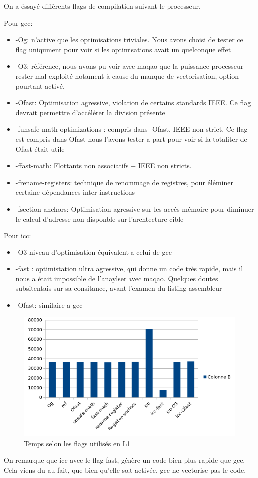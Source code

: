 \documentclass{report}
\begin{document}
On a éssayé différents flags de compilation suivant le processeur.

Pour gcc:
\begin{itemize}
    \item{-Og: n'active que les optimisations triviales. Nous avons choisi de tester ce flag uniqument pour voir si les optimisations avait un quelconque effet}
    \item{-O3: référence, nous avons pu voir avec maqao que la puissance processeur rester mal exploité notament à cause du manque de vectorisation, option pourtant activé.}
    \item{-Ofast: Optimisation agressive, violation de certains standards IEEE. Ce flag devrait permettre d'accélérer la division présente }
    \item{-funsafe-math-optimizations : compris dans -Ofast, IEEE non-strict. Ce flag est compris dans Ofast nous l'avons tester a part pour voir si la totaliter de Ofast était utile }
    \item{-ffast-math: Flottants non associatifs + IEEE non stricts.}
    \item{-frename-registers: technique de renommage de registres, pour éléminer certaine dépendances inter-instructions}
    \item{-fsection-anchors: Optimisation agressive sur les accés mémoire pour diminuer le calcul d'adresse-non disponble sur l'archtecture cible}
\end{itemize}

Pour icc:
\begin{itemize}
    \item{-O3 niveau d'optimisation équivalent a celui de gcc}
    \item{-fast : optimistation ultra agressive, qui donne un code très rapide, mais il nous a était impossible de l'anaylser avec maqao. Quelques doutes subsitentais sur sa consitance, avant l'examen du listing assembleur}
    \item {-Ofast: similaire a gcc}
\end{itemize}

\newpage
   \begin{figure}[ht!]
        \centering
        \includegraphics[width=120mm]{MEDIA/time_L1.png}
        \caption{Temps selon les flags utilisés en L1}
    \end{figure}
On remarque que icc avec le flag fast, génère un code bien plus rapide que gcc.
Cela viens du au fait, que bien qu'elle soit activée, gcc ne vectorise pas le code.
\end{document}
